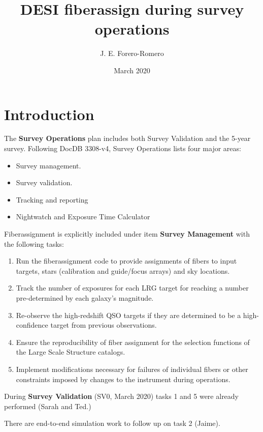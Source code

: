 \documentclass{article}
\title{DESI fiberassign during survey operations}
\author{J. E. Forero-Romero}
\date{March 2020}
\begin{document}
\maketitle

\section{Introduction}


The \textbf{Survey Operations} plan includes both Survey Validation
and the 5-year survey.  Following DocDB 3308-v4, Survey Operations
lists four major areas:

\begin{itemize}
    \item Survey management.
    \item Survey validation.
    \item Tracking and reporting
    \item Nightwatch and Exposure Time Calculator
\end{itemize}

Fiberassignment is explicitly included under item \textbf{Survey Management}
with the following tasks:

\begin{enumerate}
\item Run the fiberassignment code to provide assignments of fibers to
  input targets, stars (calibration and guide/focus arrays) and sky
  locations. 

\item Track the number of exposures for each LRG target for
  reaching a number pre-determined by each galaxy’s magnitude. 

\item Re-observe the high-redshift QSO targets if they are
  determined to be a high-confidence target from previous observations.

\item Ensure the reproducibility of fiber assignment for the
  selection functions of the Large Scale Structure catalogs.

\item Implement modifications necessary for failures of individual
  fibers or other constraints imposed by changes to the instrument
  during operations. 
\end{enumerate}


During \textbf{Survey Validation} (SV0, March 2020) tasks 1 and 5 were 
already performed (Sarah and Ted.)

There are end-to-end simulation work to follow up on task 2 (Jaime).
\end{document}
